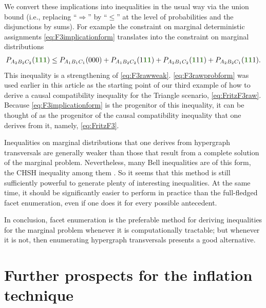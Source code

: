 \documentclass[aps,english,superscriptaddress,onecolumn,twoside,longbibliography,pra,floatfix,fleqn,nofootinbib]{revtex4-1}%
\newcommand*{\mgreen}[1]{{\color{OliveGreen}{\mathbf{#1}}}}
\theoremstyle{definition}
\DeclarePairedDelimiter{\parens}{\lparen}{\rparen}
\begin{document}
We convert these implications into inequalities in the usual way via the union bound (i.e., replacing ``$\Rightarrow$'' by ``$\leq$'' at the level of probabilities and the disjunctions by sums). For example the constraint on marginal deterministic assignments \cref{eq:F3implicationform} translates into the constraint on marginal distributions
\begin{align}\label{eq:F3rawprobform}
    P_{A_2 B_2 C_2}\parens{\mgreen{1} \mgreen{1} \mgreen{1}} \leq P_{A_1 B_1 C_1}\parens{0 0 0}+P_{A_1 B_2 C_2}\parens{1 \mgreen{1 1}}+P_{A_2 B_1 C_2}\parens{\mgreen{1} 1 \mgreen{1}}+P_{A_2 B_2 C_1}\parens{\mgreen{1 1} 1}.
\end{align}
This inequality is a strengthening of \cref{eq:F3rawweak}.  \cref{eq:F3rawprobform} was used earlier in this article as the starting point of our third example of how to derive a causal compatibility inequality for the Triangle scenario, \cref{eq:FritzF3raw}. Because \cref{eq:F3implicationform} is the progenitor of this inequality, it can be thought of as the progenitor of the causal compatibility inequality that one derives from it, namely, \cref{eq:FritzF3}.  


Inequalities on marginal distributions that one derives from hypergraph transversals are generally weaker than those that result from a complete solution of the marginal problem. Nevertheless, many Bell inequalities are of this form, the CHSH inequality among them \cite{Ghirardi08}.  So it seems that this method is still sufficiently powerful to generate plenty of interesting inequalities. At the same time, it should be significantly easier to perform in practice than the full-fledged facet enumeration, even if one does it for every possible antecedent.

In conclusion, facet enumeration is the preferable method for deriving inequalities for the marginal problem whenever it is computationally tractable; but whenever it is not, then enumerating hypergraph transversals presents a good alternative. %





\section{Further prospects for the inflation technique}\label{sec:otherprospects}
\end{document}
